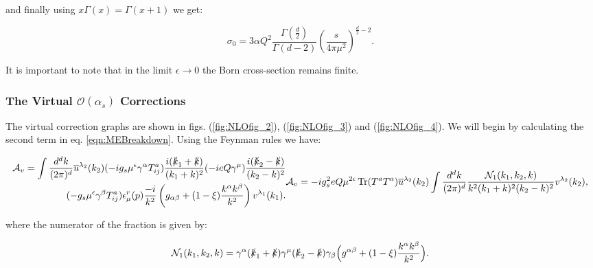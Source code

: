 			and finally using $x\Gamma(x)=\Gamma(x+1)$ we get:

			\begin{equation}
				\sigma_0 = 3\alpha Q^2 \frac{\Gamma(\frac{d}{2})}{\Gamma(d-2)}\left(\frac{s}{4\pi\mu^2}\right)^{\frac{d}{2}-2}.
				\label{eqn:bornCrossSection}
			\end{equation}

			It is important to note that in the limit $\epsilon\rightarrow0$ the Born cross-section remains finite.

		\subsubsection{The Virtual $\mathcal{O}(\alpha_s)$ Corrections}

			The virtual correction graphs are shown in figs. (\ref{fig:NLOfig_2}), (\ref{fig:NLOfig_3}) and (\ref{fig:NLOfig_4}).  We will begin by calculating
			the second term in eq. \eqref{eqn:MEBreakdown}.  Using the Feynman rules we have:

			\small
				\begin{subequations}
				\begin{align*}
					\mathcal{A}_v = \int\frac{d^{d}k}{(2\pi)^{d}} \overline{u}^{\lambda_2}(k_2)
					(-ig_s\mu^\epsilon\gamma^\alpha T^a_{ij})\frac{i(\slashed k_1 + \slashed k)}{(k_1+k)^2}
					(-ieQ\gamma^\mu)\frac{i(\slashed k_2 - \slashed k)}{(k_2 - k)^2}\\
					(-g_s\mu^\epsilon\gamma^\beta T^a_{ij})
					\epsilon^r_\mu(p)\frac{-i}{k^2}\left(g_{\alpha\beta} +
					(1-\xi)\frac{k^\alpha k^\beta}{k^2}\right)v^{\lambda_1}(k_1).
				\end{align*}
				\begin{align*}
					\mathcal{A}_v = -ig_s^2eQ\mu^{2\epsilon}\Tr(T^aT^a)\overline{u}^{\lambda_2}
					(k_2)\int\frac{d^{d}k}{(2\pi)^{d}}\frac{\mathcal{N}_1(k_1, k_2, k)}{k^2(k_1+k)^2(k_2-k)^2}v^{\lambda_2}(k_2),
				\end{align*}
				\end{subequations}
			\normalsize

			where the numerator of the fraction is given by:

			\begin{equation}
				\mathcal{N}_1(k_1, k_2, k) = \gamma^\alpha(\slashed k_1 + \slashed k)\gamma^\mu(\slashed k_2 -
				\slashed k)\gamma_\beta\Big(g^{\alpha\beta} + (1-\xi)\frac{k^\alpha k^\beta}{k^2}\Big).
			\end{equation}

